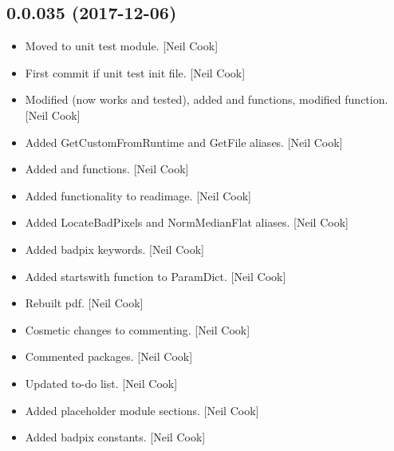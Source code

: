\documentclass[a4paper,10pt,english]{report}
\begin{document}
\subsection{0.0.035 (2017-12-06)}
\label{\detokenize{misc/changelog:id517}}\begin{itemize}
\item {} 
Moved  to unit test module. {[}Neil Cook{]}

\item {} 
First commit if unit test init file. {[}Neil Cook{]}

\item {} 
Modified  (now works and tested), added
 and  functions, modified
 function. {[}Neil Cook{]}

\item {} 
Added GetCustomFromRuntime and GetFile aliases. {[}Neil Cook{]}

\item {} 
Added  and  functions. {[}Neil
Cook{]}

\item {} 
Added functionality to readimage. {[}Neil Cook{]}

\item {} 
Added LocateBadPixels and NormMedianFlat aliases. {[}Neil Cook{]}

\item {} 
Added badpix keywords. {[}Neil Cook{]}

\item {} 
Added startswith function to ParamDict. {[}Neil Cook{]}

\item {} 
Rebuilt pdf. {[}Neil Cook{]}

\item {} 
Cosmetic changes to commenting. {[}Neil Cook{]}

\item {} 
Commented packages. {[}Neil Cook{]}

\item {} 
Updated to-do list. {[}Neil Cook{]}

\item {} 
Added placeholder module sections. {[}Neil Cook{]}

\item {} 
Added badpix constants. {[}Neil Cook{]}


\end{itemize}
\end{document}
